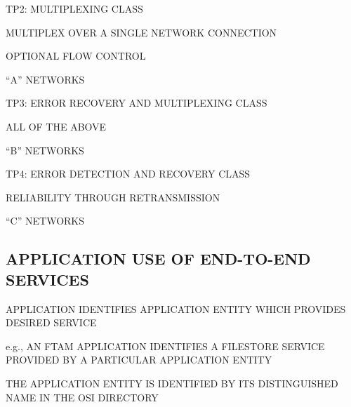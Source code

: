 \begin{bwslide}

\begin{nrtc}
\item	TP2: MULTIPLEXING CLASS
    \begin{nrtc}
    \item	MULTIPLEX OVER A SINGLE NETWORK CONNECTION

    \item	OPTIONAL FLOW CONTROL	

    \item	``A'' NETWORKS
    \end{nrtc}

\item	TP3: ERROR RECOVERY AND MULTIPLEXING CLASS
    \begin{nrtc}
    \item	ALL OF THE ABOVE

    \item	``B'' NETWORKS
    \end{nrtc}
\end{nrtc}
\end{bwslide}


\begin{bwslide}

\begin{nrtc}
\item	TP4: ERROR DETECTION AND RECOVERY CLASS
    \begin{nrtc}
    \item	RELIABILITY THROUGH RETRANSMISSION

    \item	``C'' NETWORKS
    \end{nrtc}
\end{nrtc}
\end{bwslide}


\begin{bwslide}
\part*	{APPLICATION USE OF END-TO-END SERVICES}\bf

\begin{nrtc}
\item	APPLICATION IDENTIFIES APPLICATION ENTITY WHICH PROVIDES
	DESIRED SERVICE
    \begin{nrtc}
    \item	e.g., AN FTAM APPLICATION IDENTIFIES A FILESTORE SERVICE
		PROVIDED BY A PARTICULAR APPLICATION ENTITY    
    \end{nrtc}

\item	THE APPLICATION ENTITY IS IDENTIFIED BY ITS DISTINGUISHED NAME IN
	THE OSI DIRECTORY
\end{nrtc}
\end{bwslide}


